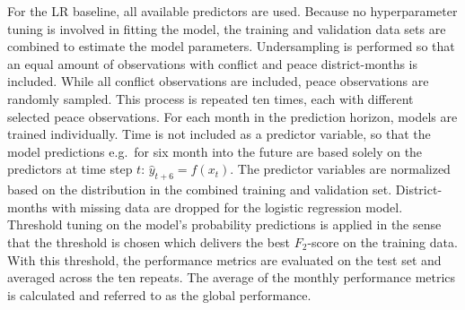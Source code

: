 \documentclass[a4paper,11pt]{article}
\begin{document}
For the LR baseline, all available predictors
are used. Because no hyperparameter tuning is involved in fitting the model,
the training and validation data sets are combined to estimate
the model parameters. Undersampling is performed so that an equal amount of
observations with conflict and peace district-months is included. While all
conflict observations are included, peace
observations are randomly sampled. This process is repeated ten times, each with different selected peace
observations. For each month in the prediction horizon, models are trained individually.
Time is not included as a predictor variable, so that the model predictions
e.g.~for six month into the future are based solely on the predictors
at time step \(t\): \(\hat{y}_{t+6} = f(x_t)\).
The predictor variables are normalized based on the distribution in the combined
training and validation set. District-months with missing data are dropped for
the logistic regression model. Threshold tuning on the model's probability predictions
is applied in the sense that the threshold is chosen which delivers the best
\(F_2\)-score on the training data. With this threshold, the performance metrics
are evaluated on the test set and averaged across the ten repeats. The average
of the monthly performance metrics is calculated and referred to as the global performance.
\end{document}
